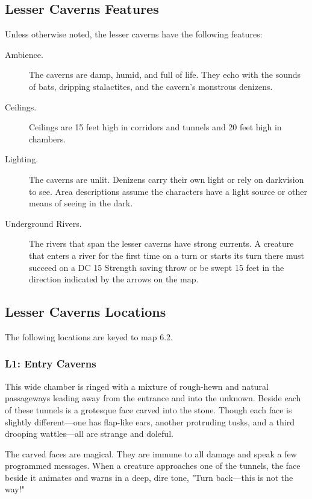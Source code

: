 \documentclass[10pt,a4paper,twoside,bg=print,twocolumn,openany,nodeprecatedcode]{dndbook}
\begin{document}
\subsection{Lesser Caverns Features}
Unless otherwise noted, the lesser caverns have the following features:


\begin{description}
\item[Ambience.]
The caverns are damp, humid, and full of life. They echo with the sounds of bats, dripping stalactites, and the cavern's monstrous denizens.
\item[Ceilings.]
Ceilings are 15 feet high in corridors and tunnels and 20 feet high in chambers.
\item[Lighting.]
The caverns are unlit. Denizens carry their own light or rely on darkvision to see. Area descriptions assume the characters have a light source or other means of seeing in the dark.
\item[Underground Rivers.]
The rivers that span the lesser caverns have strong currents. A creature that enters a river for the first time on a turn or starts its turn there must succeed on a DC 15 Strength saving throw or be swept 15 feet in the direction indicated by the arrows on the map.
\end{description}

\subsection{Lesser Caverns Locations}
The following locations are keyed to map 6.2.

\subsubsection{L1: Entry Caverns}
\begin{DndReadAloud}{}
This wide chamber is ringed with a mixture of rough-hewn and natural passageways leading away from the entrance and into the unknown. Beside each of these tunnels is a grotesque face carved into the stone. Though each face is slightly different—one has flap-like ears, another protruding tusks, and a third drooping wattles—all are strange and doleful.

\end{DndReadAloud}

The carved faces are magical. They are immune to all damage and speak a few programmed messages. When a creature approaches one of the tunnels, the face beside it animates and warns in a deep, dire tone, "Turn back—this is not the way!"
\end{document}
